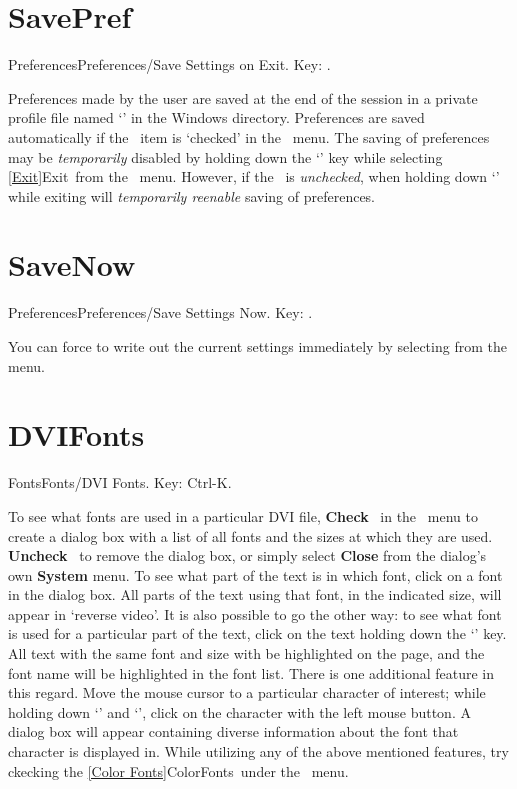 \section{SavePref}{Preferences}Preferences/Save Settings on Exit. Key: \none.

Preferences made by the user are saved at the end of the session in a private
profile file named `' in the Windows directory.
Preferences are saved automatically if the 
\ 
item is `checked' in the \ menu.
   \bigskip
The saving of preferences may be {\it temporarily\/} disabled by holding
down the `\key{Shift}' key while selecting \ref{Exit}{Exit}\ from the
\hb{File}\ menu.  However, if the 
\ 
is {\it unchecked}, when holding down `' while exiting will
{\it temporarily reenable\/} saving of preferences.

   \bigskip

\section{SaveNow}{Preferences}Preferences/Save Settings Now. Key: \none.

You can force \hb{DVIWindo} to write out the current settings
immediately by selecting  from the
\hb{Preferences} menu.

\newpage

\section{DVIFonts}{Fonts}Fonts/DVI Fonts. Key: Ctrl-K.

To see what fonts are used in a particular DVI file, {\bf Check}
\ in the \ menu to create a dialog box with a
list of all fonts and the sizes at which they are used.	 {\bf Uncheck}
\hb{DVI Fonts}\ to remove the dialog box, or simply select {\bf Close}
from the dialog's own {\bf System} menu.
   \bigskip
To see what part of the text is in which font, click on a font in the
dialog box.  All parts of the text using that font, in the indicated
size, will appear in `reverse video'.
   \bigskip
It is also possible to go the other way:  to see what font is used for a
particular part of the text, click on the text holding down the
`\key{Shift}' key.  All text with the same font and size with be
highlighted on the page, and the font name will be highlighted in the
font list.
   \bigskip
There is one additional feature in this regard.  Move the mouse cursor
to a particular character of interest; while holding down `'
and `\key{Ctrl}', click on the character with the left mouse button.  
A dialog box will appear containing diverse information about the font
that character is displayed in.
   \bigskip
While utilizing any of the above mentioned features, try ckecking the
\ref{Color Fonts}{ColorFonts}\ under the \ menu.


